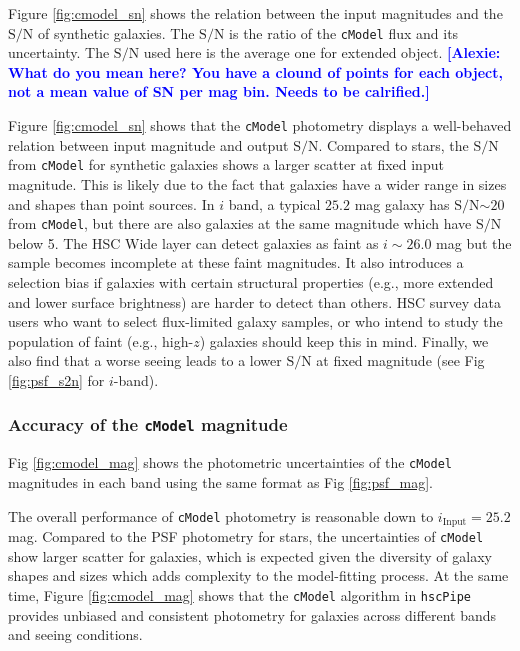 \documentclass[useamsfonts]{pasj01}
\newcommand{\alexie}[1]{\textcolor{blue}{\textbf{[Alexie: #1]}}}
\def\hscpipe{\texttt{hscPipe}}
\def\cmodel{\texttt{cModel}}
\def\s2n{{$\mathrm{S}/\mathrm{N}$}}
\begin{document}
    Figure \ref{fig:cmodel_sn} shows the relation between the input
    magnitudes and the \s2n{} of synthetic galaxies.  The  \s2n{} is the ratio  of the \cmodel{} flux and its uncertainty.    The \s2n{} used here is the average one for extended object. \alexie{What do you mean here? You have a clound of points for each object, not a mean value of SN per mag bin. Needs to be calrified.}

 Figure  \ref{fig:cmodel_sn} shows  that the \cmodel{} photometry displays a well-behaved relation between input magnitude and output \s2n{}.  Compared to stars, the \s2n{} from \cmodel{} for synthetic galaxies shows a larger
    scatter at fixed input magnitude. This is likely due to the fact that galaxies have a wider range in sizes and shapes than point sources.  In $i$ band, a typical $25.2$ mag galaxy has \s2n{}${\sim}20$ from \cmodel{}, but 
    there are also galaxies at the same magnitude which have \s2n{} below 5. The HSC Wide layer can detect galaxies as faint as $i{\sim}26.0$ mag but the 
    sample becomes incomplete at these faint magnitudes.
    It also introduces a selection bias if galaxies with certain structural properties  (e.g., more extended and lower surface brightness)
    are harder to detect than others.
    HSC survey data users who want to select flux-limited galaxy samples,
    or who intend to study the population of faint (e.g., high-$z$) galaxies should
    keep this in mind.  Finally, we also find that  a worse seeing leads to a lower \s2n{} at fixed magnitude 
    (see Fig \ref{fig:psf_s2n} for $i$-band).

\subsubsection{Accuracy of the \cmodel{} magnitude}

    Fig \ref{fig:cmodel_mag} shows the photometric uncertainties of the
    \cmodel{} magnitudes in each band using the same format as Fig \ref{fig:psf_mag}.

    The overall performance of \cmodel{} photometry is reasonable down to 
    $i_{\mathrm{Input}}=25.2$ mag.
    Compared to the PSF photometry for stars, the uncertainties of \cmodel{} show larger 
    scatter for galaxies, which is expected given the diversity of galaxy shapes and sizes which adds complexity to the model-fitting process.
    At the same time, Figure \ref{fig:cmodel_mag} shows that the \cmodel{} algorithm in \hscpipe{} provides unbiased and consistent 
    photometry for galaxies across different bands and seeing conditions.
\end{document}
